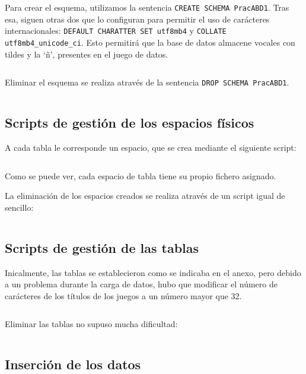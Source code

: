 \documentclass[a4paper, 11pt, oneside]{article} %
\newcommand{\scriptdir}{../scripts/} %
\begin{document}
Para crear el esquema, utilizamos la sentencia \texttt{CREATE SCHEMA PracABD1}. Tras esa, siguen otras dos que lo configuran para permitir el uso de carácteres internacionales: \texttt{DEFAULT CHARATTER SET utf8mb4} y \texttt{COLLATE utf8mb4_unicode_ci}. Esto permitirá que la base de datos almacene vocales con tildes y la `ñ', presentes en el juego de datos.\\

\inputminted{mysql}{\scriptdir creator.sql}

Eliminar el esquema se realiza através de la sentencia \texttt{DROP SCHEMA PracABD1}.\\

\inputminted{mysql}{\scriptdir dropper.sql}

\subsection{Scripts de gestión de los espacios físicos}

A cada tabla le corresponde un espacio, que se crea mediante el siguiente script:

\inputminted{mysql}{\scriptdir set_physical.sql}

Como se puede ver, cada espacio de tabla tiene su propio fichero asignado.

La eliminación de los espacios creados se realiza através de un script igual de sencillo:

\inputminted{mysql}{\scriptdir drop_physical.sql}

\subsection{Scripts de gestión de las tablas}

Inicalmente, las tablas se establecieron como se indicaba en el anexo, pero debido a un problema durante la carga de datos, hubo que modificar el número de carácteres de los títulos de los juegos a un número mayor que 32.

\inputminted{mysql}{\scriptdir set_tables.sql}

Eliminar las tablas no supuso mucha dificultad:

\inputminted{mysql}{\scriptdir drop_tables.sql}

\subsection{Inserción de los datos}
\end{document}
